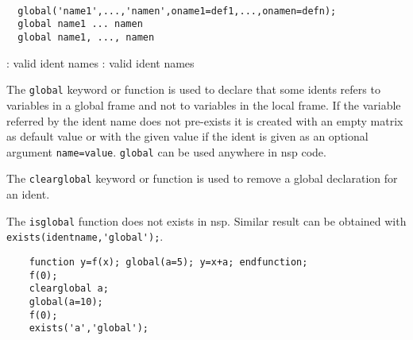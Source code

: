 \begin{mandesc}
   \\ %
   \\ %
   \\ %
\end{mandesc}
\begin{calling_sequence}
\begin{verbatim}
  global('name1',...,'namen',oname1=def1,...,onamen=defn);
  global name1 ... namen
  global name1, ..., namen
\end{verbatim}
\end{calling_sequence}
\begin{parameters}
  \begin{varlist}
    : valid ident names
    : valid ident names
  \end{varlist}
\end{parameters}
\begin{mandescription}
  The \verb!global! keyword or function is used to declare that some idents 
  refers to variables in a global frame and not to variables in the local frame.
  If the variable referred by the ident name does not pre-exists 
  it is created with an empty matrix as default value or with the given value 
  if the ident is given as an optional argument \verb!name=value!. 
  \verb!global! can be used anywhere in nsp code.
  
  The \verb!clearglobal! keyword or function is used to remove a global 
  declaration for an ident.
  
  The \verb!isglobal! function does not exists in nsp. Similar result 
  can be obtained with \verb!exists(identname,'global');!.
\end{mandescription}
\begin{examples}
  \begin{Verbatim}
    function y=f(x); global(a=5); y=x+a; endfunction;
    f(0);
    clearglobal a;
    global(a=10);
    f(0);
    exists('a','global');
  \end{Verbatim}
\end{examples}
\begin{manseealso}
     
\end{manseealso}
